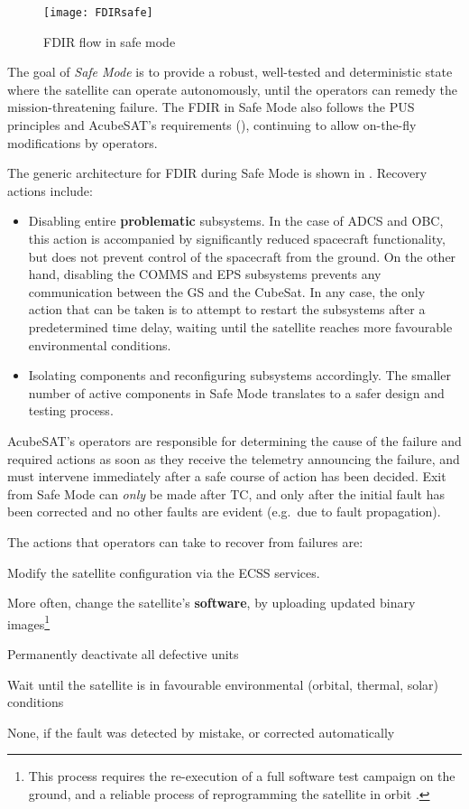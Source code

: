\documentclass[a4paper,nobib]{tufte-book}
\begin{document}
\begin{figure}[h]
	\texttt{[image: FDIRsafe]}
	\caption{\acs{FDIR} flow in safe mode}
	\label{fig:safeflow}
\end{figure}


The goal of \emph{Safe Mode} is to provide a robust, well-tested and deterministic state where the satellite can operate autonomously, until the operators can remedy the mission-threatening failure. The \acs{FDIR} in Safe Mode also follows the \acs{PUS} principles and AcubeSAT's requirements (), continuing to allow on-the-fly modifications by operators.

The generic architecture for \acs{FDIR} during Safe Mode is shown in . Recovery actions include:
\begin{itemize}
	\item Disabling entire \textbf{problematic} subsystems. In the case of \acs{ADCS} and \acs{OBC}, this action is accompanied by significantly reduced spacecraft functionality, but does not prevent control of the spacecraft from the ground. On the other hand, disabling the \acs{COMMS} and \acs{EPS} subsystems prevents any communication between the \acl{GS} and the CubeSat. In any case, the only action that can be taken is to attempt to restart the subsystems after a predetermined time delay, waiting until the satellite reaches more favourable environmental conditions.
	\item Isolating components and reconfiguring subsystems accordingly. The smaller number of active components in Safe Mode translates to a safer design and testing process.
\end{itemize}

AcubeSAT's operators are responsible for determining the cause of the failure and required actions as soon as they receive the telemetry announcing the failure, and must intervene immediately after a safe course of action has been decided. Exit from Safe Mode can \emph{only} be made after \acs{TC}, and only after the initial fault has been corrected and no other faults are evident (e.g.\ due to fault propagation).

The actions that operators can take to recover from failures are:
\begin{compactitem}
	\item Modify the satellite configuration via the \acs{ECSS} services.
	\item More often, change the satellite's \textbf{software}, by uploading updated binary images\footnote{This process requires the re-execution of a full software test campaign on the ground, and a reliable process of reprogramming the satellite in orbit \autocite[45]{DDJF_OBSW}.}
	\item Permanently deactivate all defective units
	\item Wait until the satellite is in favourable environmental (orbital, thermal, solar) conditions
	\item None, if the fault was detected by mistake, or corrected automatically
\end{compactitem}
\end{document}
